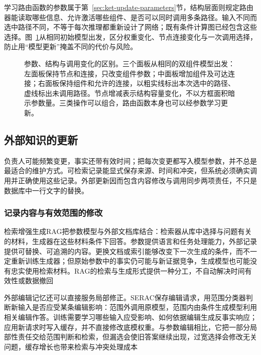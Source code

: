 学习路由函数的参数属于第~\ref{sec:ket-update-parameters}节，结构层面则规定路由器能读取哪些信息、允许激活哪些组件、是否可以同时调用多条路径。输入不同而选中路径不同，不等于每次推理都重新设计了网络；既有条件计算图已经包含这些选择。图~\ref{fig:ket-update-operations}从相同初始模型出发，区分权重变化、节点连接变化与一次调用选择，防止用“模型更新”掩盖不同的代价与风险。

\begin{figure}[htbp]
\centering

\caption{参数、结构与调用变化的区别。三个面板从相同的双组件模型出发：左面板保持节点和连接，只改变组件参数；中面板增加组件及可达连接；右面板保持组件和允许的连接，以粗实线标出本次选中的路径、虚线标出未调用路径。节点增减表示结构容量变化，不以方框面积暗示参数量。三类操作可以组合，路由函数本身也可以经参数学习更新。}
\label{fig:ket-update-operations}
\end{figure}

\subsection{外部知识的更新}
\label{sec:ket-update-external}

负责人可能频繁变更，事实还带有效时间；把每次变更都写入模型参数，并不总是最适合的维护方式。可检索记录能显式保存来源、时间和冲突，但系统必须确实调用并正确使用这些记录。外部更新因而包含内容修改与调用同步两项责任，不只是数据库中一行文字的替换。

\subsubsection{记录内容与有效范围的修改}
\label{sec:ket-update-records}

检索增强生成RAG把参数模型与外部文档库结合：检索器从库中选择与问题有关的材料，生成器在这些材料条件下回答。参数提供语言和任务处理能力，外部记录提供可替换、可追溯的内容。更换文档或索引能够改变下一次生成的条件，而不一定重新训练生成器；但原始参数中的事实仍可能与新证据竞争，生成模型也可能没有忠实使用检索材料。RAG的检索与生成形式提供一种分工，不自动解决时间有效性或数据撤回

外部编辑记忆还可以直接服务局部修正。SERAC保存编辑请求，用范围分类器判断新输入是否应受某条编辑影响：范围外调用原模型，范围内由条件生成模型利用相关编辑作答。训练需要学习哪些输入应受影响、如何依据编辑生成反事实响应；应用新请求时写入缓存，并不直接修改底模权重。与参数编辑相比，它把一部分局部性责任交给范围判断和检索，但漏选会使旧答案继续出现，过宽选择会修改无关问题，缓存增长也带来检索与冲突处理成本

